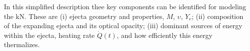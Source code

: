 

In this simplified description thee key components can be identified for modeling the \ac{kN}.
These are 
    (i) ejecta geometry and properties, $M$, $\upsilon$, $Y_e$; 
    (ii) composition of the expanding ejecta and its optical opacity; 
    (iii) dominant sources of energy within the ejecta, heating rate $\dot{Q}(t)$, and how 
    efficiently this energy thermalizes.
%

